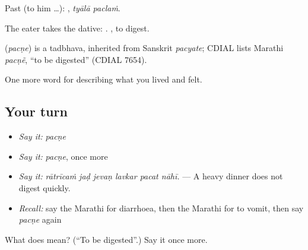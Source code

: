 Past (to him …):  , \emph{tyālā paclaṁ}.

The eater takes the dative:  . , to digest.

\begin{cousinweb}
\textbf{} (\emph{pacṇe}) is a tadbhava, inherited from Sanskrit \emph{pacyate}; CDIAL lists Marathi \emph{pacṇẽ}, \textquotedblleft{}to be digested\textquotedblright{} (CDIAL 7654).
\end{cousinweb}

\begin{grammarlens}[title={What you've built}]
One more word for describing what you lived and felt.
\end{grammarlens}

\subsection*{Your turn}
\begin{itemize}
\raggedright
  \item \emph{Say it:} \emph{pacṇe}
  \item \emph{Say it:} \emph{pacṇe}, once more
  \item \emph{Say it:} \emph{rātrīcaṁ jaḍ jevaṇ lavkar pacat nāhī.} — A heavy dinner does not digest quickly.
  \item \emph{Recall:} say the Marathi for diarrhoea, then the Marathi for to vomit, then say \emph{pacṇe} again
\end{itemize}

\begin{tcolorbox}[breakable,colback=teal!4,colframe=teal!35!black,title={Before you move on}]
What does  mean? (\textquotedblleft{}To be digested\textquotedblright{}.) Say it once more.
\end{tcolorbox}
